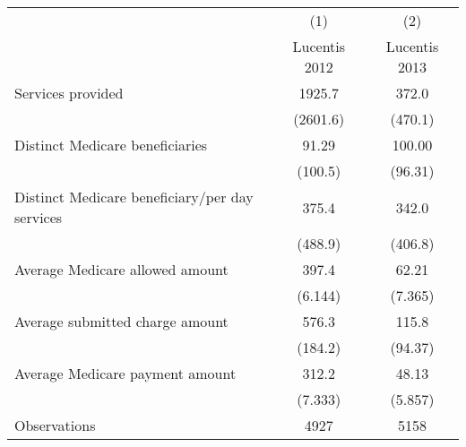 \def\sym#1{\ifmmode^{#1}\else\(^{#1}\)\fi}
\begin{adjustbox}{max
width={\textwidth},caption={Summary Statistics, Lucentis and Avastin\label{table:lucentisavastinsum}},nofloat=table}
\begin{tabular}{l*{2}{c}}
\toprule
                    &\multicolumn{1}{c}{(1)}&\multicolumn{1}{c}{(2)}\\
                    &\multicolumn{1}{c}{Lucentis 2012}&\multicolumn{1}{c}{Lucentis 2013}\\
\midrule
Services provided   &      1925.7         &       372.0         \\
                    &    (2601.6)         &     (470.1)         \\
\addlinespace
Distinct Medicare beneficiaries&       91.29         &      100.00         \\
                    &     (100.5)         &     (96.31)         \\
\addlinespace
Distinct Medicare beneficiary/per day services&       375.4         &       342.0         \\
                    &     (488.9)         &     (406.8)         \\
\addlinespace
Average Medicare allowed amount&       397.4         &       62.21         \\
                    &     (6.144)         &     (7.365)         \\
\addlinespace
Average submitted charge amount&       576.3         &       115.8         \\
                    &     (184.2)         &     (94.37)         \\
\addlinespace
Average Medicare payment amount&       312.2         &       48.13         \\
                    &     (7.333)         &     (5.857)         \\
\midrule
Observations        &        4927         &        5158         \\
\bottomrule
\end{tabular}\end{adjustbox}
